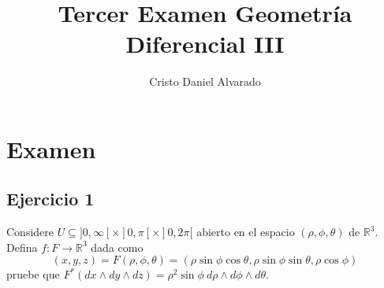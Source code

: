 \documentclass[12pt]{report}
\theoremstyle{largebreak}
\newcommand\cf[3]{\ensuremath{#1:#2\rightarrow#3}}
\begin{document}
    \title{Tercer Examen Geometría Diferencial III}
    \author{Cristo Daniel Alvarado}
    \maketitle

    \tableofcontents %

    
    \chapter{Examen}
    
    \renewcommand{\theenumi}{\roman{enumi}}
    \renewcommand{\labelenumi}{{(\theenumi)}}

    \section{Ejercicio 1}

    \begin{excer}
        Considere $U\subseteq ]0,\infty[\times]0,\pi[\times]0,2\pi[$ abierto en el espacio $(\rho, \phi, \theta)$ de $\mathbb{R}^3$. Defina $\cf{f}{F}{\mathbb{R}^3}$ dada como
        \begin{equation*}
            (x,y,z)=F(\rho,\phi,\theta)=(\rho\sin\phi\cos\theta,\rho\sin\phi\sin\theta,\rho\cos\phi)
        \end{equation*}
        pruebe que $F^*(dx\wedge dy\wedge dz)=\rho^2\sin\phi\:d\rho\wedge d\phi\wedge d\theta$.
    \end{excer}
\end{document}
